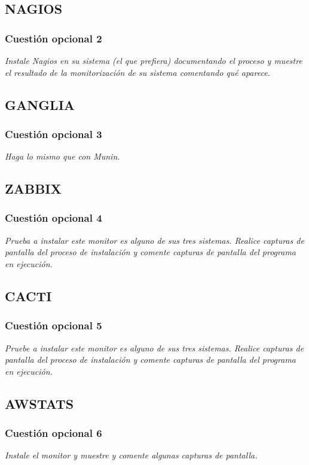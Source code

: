 \subsection{NAGIOS}


\subsubsection{Cuestión opcional 2}
\textit{Instale Nagios en su sistema (el que prefiera) documentando el proceso y muestre el resultado de la monitorización de su sistema comentando qué aparece.}
\subsection{GANGLIA}


\subsubsection{Cuestión opcional 3}
\textit{Haga lo mismo que con Munin.}
\subsection{ZABBIX}


\subsubsection{Cuestión opcional 4}
\textit{Prueba a instalar este monitor es alguno de sus tres sistemas. Realice capturas de pantalla del proceso de instalación y comente capturas de pantalla del programa en ejecución.}
\subsection{CACTI}


\subsubsection{Cuestión opcional 5}
\textit{Pruebe a instalar este monitor es alguno de sus tres sistemas. Realice capturas de pantalla del proceso de instalación y comente capturas de pantalla del programa en ejecución.}
\subsection{AWSTATS}


\subsubsection{Cuestión opcional 6}
\textit{Instale el monitor y muestre y comente algunas capturas de pantalla.}
